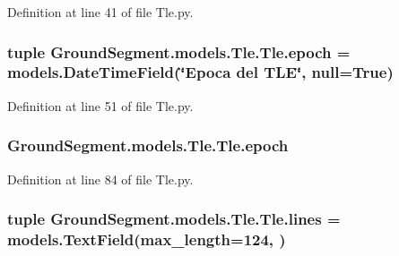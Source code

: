 Definition at line 41 of file Tle.\+py.

\hypertarget{class_ground_segment_1_1models_1_1_tle_1_1_tle_adbe4180b2b304b13ec62581aca377ffa}{}
\subsubsection[{epoch}]{\setlength{\rightskip}{0pt plus 5cm}tuple Ground\+Segment.\+models.\+Tle.\+Tle.\+epoch = models.\+Date\+Time\+Field(\char`\"{}Epoca del T\+L\+E\char`\"{}, null=True)\hspace{0.3cm}{\ttfamily [static]}}\label{class_ground_segment_1_1models_1_1_tle_1_1_tle_adbe4180b2b304b13ec62581aca377ffa}


Definition at line 51 of file Tle.\+py.

\hypertarget{class_ground_segment_1_1models_1_1_tle_1_1_tle_ad99155dd9e68ea90cdfe8d44cf1ac897}{}
\subsubsection[{epoch}]{\setlength{\rightskip}{0pt plus 5cm}Ground\+Segment.\+models.\+Tle.\+Tle.\+epoch}\label{class_ground_segment_1_1models_1_1_tle_1_1_tle_ad99155dd9e68ea90cdfe8d44cf1ac897}


Definition at line 84 of file Tle.\+py.

\hypertarget{class_ground_segment_1_1models_1_1_tle_1_1_tle_ac5a4980b37f61f042cb30d0a268755eb}{}
\subsubsection[{lines}]{\setlength{\rightskip}{0pt plus 5cm}tuple Ground\+Segment.\+models.\+Tle.\+Tle.\+lines = models.\+Text\+Field(max\+\_\+length=124, )\hspace{0.3cm}{\ttfamily [static]}}\label{class_ground_segment_1_1models_1_1_tle_1_1_tle_ac5a4980b37f61f042cb30d0a268755eb}


